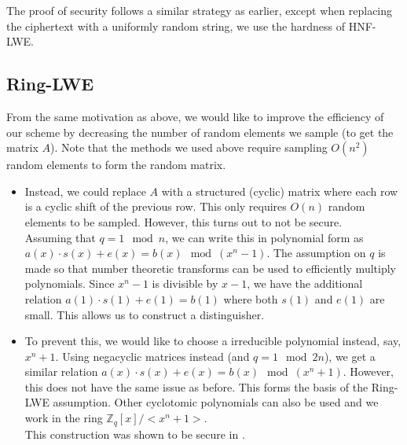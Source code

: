 The proof of security follows a similar strategy as earlier, except when replacing the ciphertext with a uniformly random string, we use the hardness of HNF-LWE.

\subsection{Ring-LWE}
From the same motivation as above, we would like to improve the efficiency of our scheme by decreasing the number of random elements we sample (to get the matrix $A$). Note that the methods we used above require sampling $O(n^2)$ random elements to form the random matrix. 
\begin{itemize}
    \item Instead, we could replace $A$ with a structured (cyclic) matrix where each row is a cyclic shift of the previous row. This only requires $O(n)$ random elements to be sampled. However, this turns out to not be secure. \\
    Assuming that $q = 1 \mod n$, we can write this in polynomial form as $a(x) \cdot s(x) + e(x) = b(x) \mod (x^n - 1)$. The assumption on $q$ is made so that number theoretic transforms can be used to efficiently multiply polynomials. Since $x^n - 1$ is divisible by $x-1$, we have the additional relation $a(1) \cdot s(1) + e(1) = b(1)$ where both $s(1)$ and $e(1)$ are small. This allows us to construct a distinguisher.

    \item To prevent this, we would like to choose a irreducible polynomial instead, say, $x^n + 1$. Using negacyclic matrices instead (and $q = 1 \mod 2n$), we get a similar relation $a(x) \cdot s(x) + e(x) = b(x) \mod (x^n + 1)$. However, this does not have the same issue as before. This forms the basis of the Ring-LWE assumption. Other cyclotomic polynomials can also be used and we work in the ring $\mathbb{Z}_q[x]/<x^n + 1>$. \\
    This construction was shown to be secure in \cite{EC:LyuPeiReg10}.
\end{itemize}

